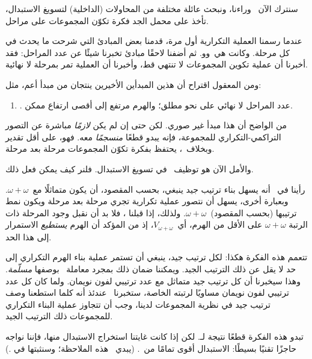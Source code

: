 \documentclass[../../../include/open-logic-section]{subfiles}
\begin{document}

سنترك الآن~\limofsize{} وراءنا، ونبحث عائلة مختلفة من المحاولات
(الداخلية) لتسويغ الاستبدال، تأخذ على محمل الجد فكرة تكوّن المجموعات
على مراحل.

عندما رسمنا العملية التكرارية أول مرة، قدمنا بعض المبادئ التي شرحت ما
يحدث في كل مرحلة. وكانت هي~\stageshier و\stagesord و\stagesacc. ثم
أضفنا لاحقًا مبادئ تخبرنا شيئًا عن عدد المراحل: فقد أخبرنا
\stagessucc{} أن عملية تكوين المجموعات لا تنتهي قط، وأخبرنا
\stagesinf{} أن العملية تمر بمرحلة لا نهائية.

ومن المعقول اقتراح أن هذين المبدأين الأخيرين ينتجان من مبدأ أعم، مثل:
\begin{enumerate}
	\item[] \stagesinex. عدد المراحل لا نهائي على نحو مطلق؛ والهرم
	مرتفع إلى أقصى ارتفاع ممكن.
\end{enumerate}
من الواضح أن هذا مبدأ غير صوري. لكن حتى إن لم يكن \emph{لازمًا}
مباشرة عن التصور التراكمي-التكراري للمجموعة، فإنه يبدو قطعًا
\emph{منسجمًا} معه. فهو، على أقل تقدير وبخلاف~\limofsize، يحتفظ بفكرة
تكوّن المجموعات مرحلة بعد مرحلة.

والأمل الآن هو توظيف~\stagesinex{} في تسويغ الاستبدال. فلنر كيف يمكن
فعل ذلك.

رأينا في~ أنه يسهل بناء ترتيب جيد ينبغي،
بحسب المقصود، أن يكون متماثلًا مع~$\omega+\omega$.
وبعبارة أخرى، يسهل أن نتصور عملية تكرارية تجري مرحلة بعد مرحلة ويكون
نمط ترتيبها (بحسب المقصود)~$\omega+\omega$. ولذلك، إذا قبلنا
\stagesinex، فلا بد أن نقبل وجود المرحلة ذات الرتبة
$\omega+\omega$ على الأقل من الهرم، أي~$V_{\omega+\omega}$، إذ من
المؤكد أن الهرم \emph{يستطيع} الاستمرار إلى هذا الحد.

تتعمم هذه الفكرة هكذا: لكل ترتيب جيد، ينبغي أن تستمر عملية بناء الهرم
التكراري إلى حد لا يقل عن ذلك الترتيب الجيد. ويمكننا ضمان ذلك بمجرد
معاملة~ بوصفها
\emph{مسلّمة}. وهذا سيخبرنا أن كل ترتيب جيد متماثل مع عدد ترتيبي لفون
نويمان. ولما كان كل عدد ترتيبي لفون نويمان مساويًا لرتبته الخاصة،
ستخبرنا~ عندئذ
أنه كلما استطعنا وصف ترتيب جيد في نظرية المجموعات لدينا، وجب أن تتجاوز
عملية البناء التكراري للمجموعات ذلك الترتيب الجيد.

تبدو هذه الفكرة قطعًا نتيجة لـ\stagesinex. لكن إذا كانت غايتنا
استخراج الاستبدال منها، فإننا نواجه حاجزًا تقنيًا بسيطًا: الاستبدال
أقوى تمامًا من~.
(يبدي~\citet[\S13.2]{Potter2004} هذه الملاحظة؛ وسنثبتها في
.)
\end{document}
